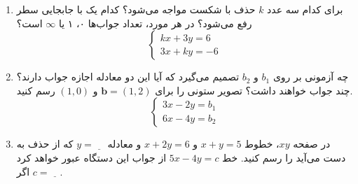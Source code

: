\documentclass[12pt, a4paper]{book}
\theoremstyle{translator}
\begin{document}
\begin{enumerate}
		\item برای کدام سه عدد $k$ حذف با شکست مواجه می‌شود؟ کدام یک با جابجایی سطر رفع می‌شود؟ در هر مورد، تعداد جواب‌ها ۰، ۱ یا $\infty$ است؟
		\[
		\begin{cases}
			kx + 3y = 6 \\
			3x + ky = -6
		\end{cases}
		\]
		
		\item چه آزمونی بر روی $b_1$ و $b_2$ تصمیم می‌گیرد که آیا این دو معادله اجازه جواب دارند؟ چند جواب خواهند داشت؟ تصویر ستونی را برای $\mathbf{b}=(1,2)$ و $(1,0)$ رسم کنید.
		\[
		\begin{cases}
			3x - 2y = b_1 \\
			6x - 4y = b_2
		\end{cases}
		\]
		
		\item در صفحه $xy$، خطوط $x+y=5$ و $x+2y=6$ و معادله $y = \underline{\phantom{00}}$ که از حذف به دست می‌آید را رسم کنید. خط $5x-4y=c$ از جواب این دستگاه عبور خواهد کرد اگر $c = \underline{\phantom{00}}$.
	\end{enumerate}
	
\end{document}
